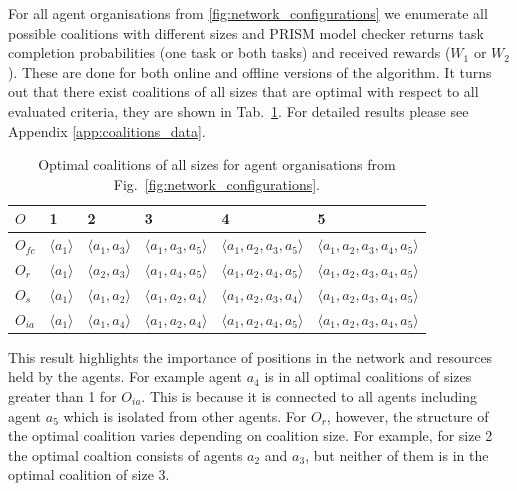 \documentclass{llncs}
\newcommand{\LD}{\langle}
\newcommand{\RD}{\rangle}
\begin{document}
%
For all agent organisations from \ref{fig:network_configurations} we enumerate all possible coalitions with different sizes and PRISM model checker returns task completion probabilities (one task or both tasks) and received rewards ($W_1$ or $W_2$). These are done for both online and offline versions of the algorithm. It turns out that there exist coalitions of all sizes that are optimal with respect to all evaluated criteria, they are shown in Tab.~\ref{tab:optimal_coalitions}.
For detailed results please see Appendix \ref{app:coalitions_data}.
\vspace{-8mm}
\begin{table}
 \centering
 \begin{tabular}{ | l | l | l | l | l | l |}
    \hline
    $O$ & 1& 2 & 3 & 4 & 5 \\ \hline
    $O_{fc}$ & $\LD a_1 \RD$ & $\LD a_1, a_3 \RD$ & $\LD a_1, a_3, a_5 \RD$ & $\LD a_1, a_2, a_3, a_5 \RD$  & $\LD a_1, a_2, a_3, a_4, a_5 \RD$ \\ \hline
    $O_r$ & $\LD a_1 \RD$  & $\LD a_2, a_3 \RD$ & $\LD a_1, a_4, a_5 \RD$ & $\LD a_1, a_2, a_4, a_5 \RD$  & $\LD a_1, a_2, a_3, a_4, a_5 \RD$ \\ \hline
    $O_s$ & $\LD a_1 \RD$  & $\LD a_1, a_2 \RD$ & $\LD a_1, a_2, a_4 \RD$ & $\LD a_1, a_2, a_3, a_4 \RD$  & $\LD a_1, a_2, a_3, a_4, a_5 \RD$ \\ \hline
    $O_{ia}$ & $\LD a_1 \RD$  & $\LD a_1, a_4 \RD$ & $\LD a_1, a_2, a_4 \RD$ & $\LD a_1, a_2, a_4, a_5 \RD$  & $\LD a_1, a_2, a_3, a_4, a_5 \RD$ \\ \hline
\end{tabular}
\caption{Optimal coalitions of all sizes for agent organisations from Fig.~\ref{fig:network_configurations}.}
\label{tab:optimal_coalitions}
\end{table}

This result highlights the importance of positions in the network and resources held by the agents.
For example agent $a_4$ is in all optimal coalitions of sizes greater than 1 for $O_{ia}$.
This is because it is connected to all agents including agent $a_5$ which is isolated from other agents.
For $O_r$, however, the structure of the optimal coalition varies depending on coalition size. For example, for size 2 the optimal coaltion consists of agents $a_2$ and $a_3$, but neither of them is in the optimal coalition of size 3.
\end{document}
